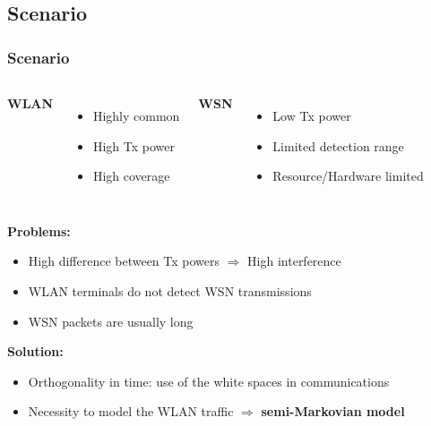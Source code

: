 \documentclass[9pt,handout,serif]{beamer}
\begin{document}
\subsection{Scenario}
\begin{frame}[c]
	\frametitle{Scenario}
	\begin{columns}
		\textbf{WLAN}
		\begin{itemize}
			\item Highly common
			\item High Tx power
			\item High coverage
		\end{itemize}
		\textbf{WSN}
		\begin{itemize}
			\item Low Tx power
			\item Limited detection range
			\item Resource/Hardware limited
		\end{itemize}
	\end{columns}
	
	\vspace{0.2in}
	
	\textbf{Problems:}
	\begin{itemize}
		\item High difference between Tx powers $\Rightarrow$ High interference
		\item WLAN terminals do not detect WSN transmissions
		\item WSN packets are usually long
	\end{itemize}
	\textbf{Solution:}
	\begin{itemize}
		\item Orthogonality in time: use of the white spaces in communications
		\item Necessity to model the WLAN traffic $\Rightarrow$ \textbf{semi-Markovian model}
	\end{itemize}
\end{frame}
\end{document}
